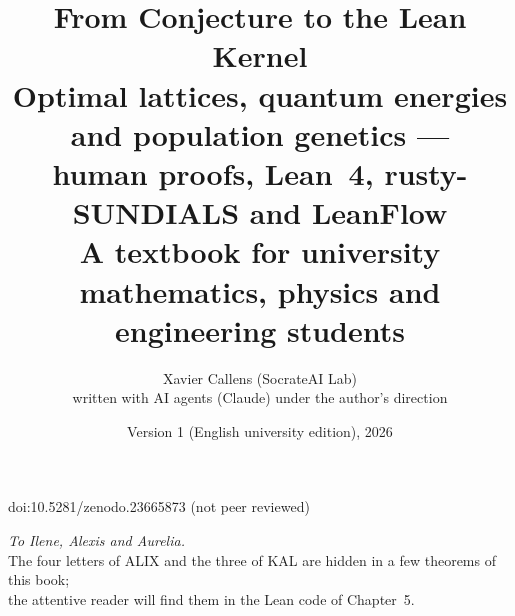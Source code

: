 \documentclass[11pt,a4paper,openany]{book}
\title{\textbf{From Conjecture to the Lean Kernel}\\[0.5em]
\large Optimal lattices, quantum energies and population genetics ---\\ human proofs, Lean~4, rusty-SUNDIALS and LeanFlow\\[0.5em]
\normalsize A textbook for university mathematics, physics and engineering students}
\author{Xavier Callens (SocrateAI Lab)\\[0.3em]\small written with AI agents (Claude) under the author's direction}
\date{Version 1 (English university edition), 2026}
\theoremstyle{plain}
\theoremstyle{definition}
\theoremstyle{remark}
\begin{document}
\frontmatter
\maketitle
\begin{center}\small doi:10.5281/zenodo.23665873 \quad (not peer reviewed)\end{center}

\thispagestyle{empty}
\vspace*{\fill}
\begin{center}
\Large\emph{To Ilene, Alexis and Aurelia.}\\[1em]
\normalsize The four letters of ALIX and the three of KAL are hidden in a few theorems of this book;\\
the attentive reader will find them in the Lean code of Chapter~5.
\end{center}
\vspace*{\fill}
\clearpage

\tableofcontents
\mainmatter






\appendix






\backmatter

\end{document}
